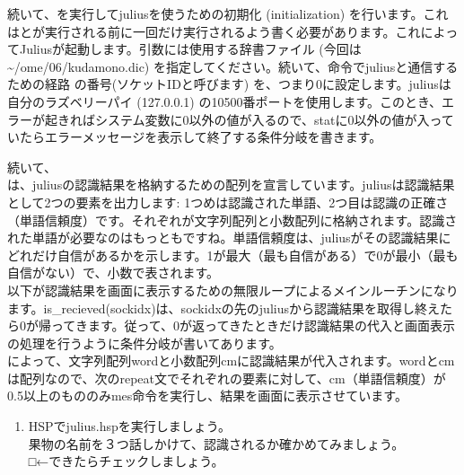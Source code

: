 続いて、を実行してjuliusを使うための初期化 (initialization) を行います。これはとが実行される前に一回だけ実行されるよう書く必要があります。これによってJuliusが起動します。引数には使用する辞書ファイル (今回は \textasciitilde /ome/06/kudamono.dic) を指定してください。続いて、命令でjuliusと通信するための経路 の番号(ソケットIDと呼びます) を、つまり0に設定します。juliusは自分のラズベリーパイ (127.0.0.1) の10500番ポートを使用します。このとき、エラーが起きればシステム変数に0以外の値が入るので、statに0以外の値が入っていたらエラーメッセージを表示して終了する条件分岐を書きます。

続いて、\\
は、juliusの認識結果を格納するための配列を宣言しています。juliusは認識結果として2つの要素を出力します: 1つめは認識された単語、2つ目は認識の正確さ（単語信頼度）です。それぞれが文字列配列と小数配列に格納されます。認識された単語が必要なのはもっともですね。単語信頼度は、juliusがその認識結果にどれだけ自信があるかを示します。1が最大（最も自信がある）で0が最小（最も自信がない）で、小数で表されます。\\
以下が認識結果を画面に表示するための無限ループによるメインルーチンになります。is\_recieved(sockidx)は、sockidxの先のjuliusから認識結果を取得し終えたら0が帰ってきます。従って、0が返ってきたときだけ認識結果の代入と画面表示の処理を行うように条件分岐が書いてあります。\\
によって、文字列配列wordと小数配列cmに認識結果が代入されます。wordとcmは配列なので、次のrepeat文でそれぞれの要素に対して、cm（単語信頼度）が0.5以上のもののみmes命令を実行し、結果を画面に表示させています。\\
\begin{tcolorbox}[title=\useOmetoi]
\begin{enumerate}
\item HSPでjulius.hspを実行しましょう。\\果物の名前を３つ話しかけて、認識されるか確かめてみましょう。\\□←できたらチェックしましょう。
\end{enumerate}
\end{tcolorbox}
